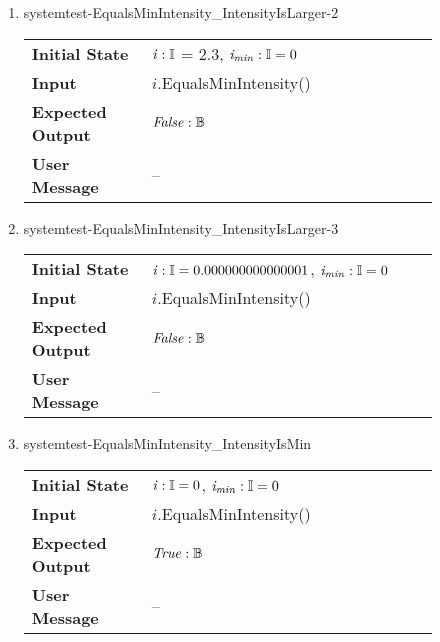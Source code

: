 \begin{enumerate}
    \item{systemtest-EqualsMinIntensity\_IntensityIsLarger-2}
    \begin{table}[H]
        \centering
        \begin{tabular}{P{0.25\linewidth}P{0.6\linewidth}}
            \toprule
            \textbf{Initial State} & $\mathit{i} : \mathbb{I}$ =
            2.3, $\mathit{i_{min}} : \mathbb{I} = 0$ \\
            \textbf{Input} & $\mathit{i}$.EqualsMinIntensity() \\ \midrule
            \textbf{Expected Output} & $\mathit{False} : \mathbb{B}$ \\
            \textbf{User Message} & -- \\ \bottomrule
        \end{tabular}
    \end{table}

    \item{systemtest-EqualsMinIntensity\_IntensityIsLarger-3}
    \begin{table}[H]
        \centering
        \begin{tabular}{P{0.25\linewidth}P{0.6\linewidth}}
            \toprule
            \textbf{Initial State} & $\mathit{i} : \mathbb{I} =
            0.000000000000001$, $\mathit{i_{min}} : \mathbb{I} = 0$
            \\
            \textbf{Input} & $\mathit{i}$.EqualsMinIntensity() \\
            \midrule
            \textbf{Expected Output} & $\mathit{False} : \mathbb{B}$ \\
            \textbf{User Message} & -- \\ \bottomrule
        \end{tabular}
    \end{table}

    \item{systemtest-EqualsMinIntensity\_IntensityIsMin}
    \begin{table}[H]
        \centering
        \begin{tabular}{P{0.25\linewidth}P{0.6\linewidth}}
            \toprule
            \textbf{Initial State} & $\mathit{i} : \mathbb{I} = 0$,
            $\mathit{i_{min}} : \mathbb{I} = 0$ \\
            \textbf{Input} & $\mathit{i}$.EqualsMinIntensity() \\
            \midrule
            \textbf{Expected Output} & $\mathit{True} : \mathbb{B}$ \\
            \textbf{User Message} & -- \\ \bottomrule
        \end{tabular}
    \end{table}


\end{enumerate}
